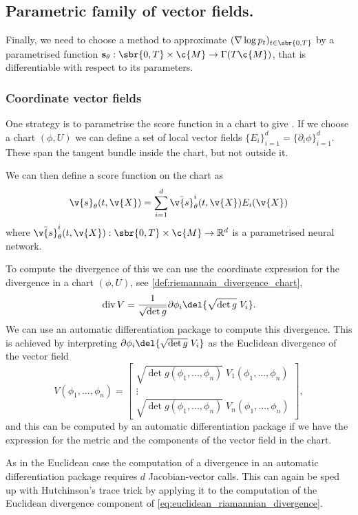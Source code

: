 \subsection{Parametric family of vector fields.}
\label{sec:parametric_vector_fields}
Finally, we need to choose a method to approximate \((\nabla \log p_t)_{t \in \sbr{0,T}}\) by a parametrised function \(\mathbf{s}_\theta: \sbr{0,T} \x \c{M} \to \Gamma(T\c{M})\), that is differentiable with respect to its parameters.

\subsubsection{Coordinate vector fields}
One strategy is to parametrise the score function in a chart to give .
If we choose a chart \((\phi, U)\) we can define a set of local vector fields \(\{E_i\}_{i=1}^d = \{\partial_i \phi\}_{i=1}^d\).
These span the tangent bundle inside the chart, but not outside it.

We can then define a score function on the chart as
\[
	\v{s}_\theta(t, \v{X}) = \sum_{i=1}^d \bar{\v{s}}^i_\theta(t, \v{X}) E_i(\v{X})
\]
where \(\bar{\v{s}}^i_\theta(t, \v{X}): \sbr{0, T} \x \c{M} \to \R^d\) is a parametrised neural network.

To compute the divergence of this we can use the coordinate expression for the divergence in a chart \((\phi, U)\), see \cref{def:riemannain_divergence_chart},
\[\dive V = \frac{1}{\sqrt{\det g}} \partial\phi_i \del{\sqrt{\det g}\; V_i}\label{eq:riemannian_divergence_coords}.\]
We can use an automatic differentiation package to compute this divergence.
This is achieved by interpreting  \(\partial\phi_i \del{\sqrt{\det g}\; V_i}\) as the Euclidean divergence of the vector field \[V(\phi_1, ..., \phi_n) = \begin{bmatrix}
	\sqrt{\det g(\phi_1, ..., \phi_n)}\; V_1 (\phi_1, ..., \phi_n) \\ \vdots \\ \sqrt{\det g(\phi_1, ..., \phi_n)}\; {V}_n (\phi_1, ..., \phi_n)
\end{bmatrix}\label{eq:euclidean_riamannian_divergence},\]
and this can be computed by an automatic differentiation package if we have the expression for the metric and the components of the vector field in the chart.

As in the Euclidean case the computation of a divergence in an automatic differentiation package requires \(d\) Jacobian-vector calls.
This can again be sped up with Hutchinson's trace trick \parencite{hutchinson1989stochastic} by applying it to the computation of the Euclidean divergence component of \cref{eq:euclidean_riamannian_divergence}. 

